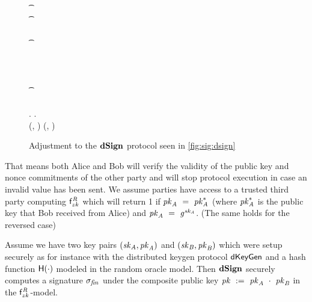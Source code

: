 \begin{figure}
\begin{center}
{\begin{varwidth}{\textwidth}
{            \color{blue} \pcif \procZkf{\cnstRelation}{\varPubKeyBob}  \opOr \pcskipln \\
            \t \color{blue}   \\
            \t \color{blue} \pcreturn \cnstFalsum \\
            \pcif \procVerfPtSig{\varSigBob}{\varMsg}{\varPubKeyBob}  \< \< \\
            \t \pcreturn \cnstFalsum \< \< \\
            \varSigAlice \opFunResult \procSignPrt{\varMsg}{\varSecKeyAlice}{\varNonceAlice}{\varSigContext} \< \< \\
            \< \sendmessageright*{\varSigAlice} \< \\
            \< \< \pcif \procVerfPtSig{\varSigAlice}{\varMsg}{\varPubKeyAlice}  \\
            \< \< \t \pcreturn \cnstFalsum \\
            \varSigFin \opFunResult \procFinSig{\varSigAlice}{\varSigBob} \< \< \varSigFin \opFunResult \procFinSig{\varSigAlice}{\varSigBob} \\
            \varPubKey \opFunResult \varSigContext.\varPubKey \< \< \varPubKey \opFunResult \varSigContext.\varPubKey \\
            \pcreturn (\varSigFin, \varPubKey) \< \< \pcreturn (\varSigFin, \varPubKey)
            }
        \end{varwidth}
        }
    \end{center}
    \caption{Adjustment to the $\mathbf{dSign}$ protocol seen in \cref{fig:sig:dsign}} \label{fig:sig:dsign-adj}
\end{figure}
That means both Alice and Bob will verify the validity of the public key and nonce commitments of the other party and will stop protocol execution in case an invalid value has been sent.
We assume parties have access to a trusted third party computing $\mathsf{f}^{\mathit{R}}_{zk}$ which will return 1 if $\mathit{pk}_{\mathit{A}} ~=~ \mathit{pk}_{\mathit{A}}^*$ (where $\mathit{pk}_{\mathit{A}}^*$ is the public key that Bob received from Alice) and $\mathit{pk}_{\mathit{A}} ~=~ \mathit{g}^{\mathit{sk}_{\mathit{A}}}$. (The same holds for the reversed case)

\begin{theorem}\label{lem:sig:dsign}
Assume we have two key pairs $(\mathit{sk}_{\mathit{A}}, \mathit{pk}_{\mathit{A}})$ and $(\mathit{sk}_{\mathit{B}}, \mathit{pk}_{\mathit{B}})$ which were setup securely as for instance with the distributed keygen protocol $\mathsf{dKeyGen}$ and a hash function $\mathsf{H} (\cdot)$ modeled in the random oracle model.
    Then $\mathbf{dSign}$ securely computes a signature $\sigma_{\mathit{fin}}$ under the composite public key $\mathit{pk} ~:=~ \mathit{pk}_{\mathit{A}} ~\cdot~ \mathit{pk}_{\mathit{B}}$ in the $\mathsf{f}^{\mathit{R}}_{zk}$-model.
\end{theorem}

